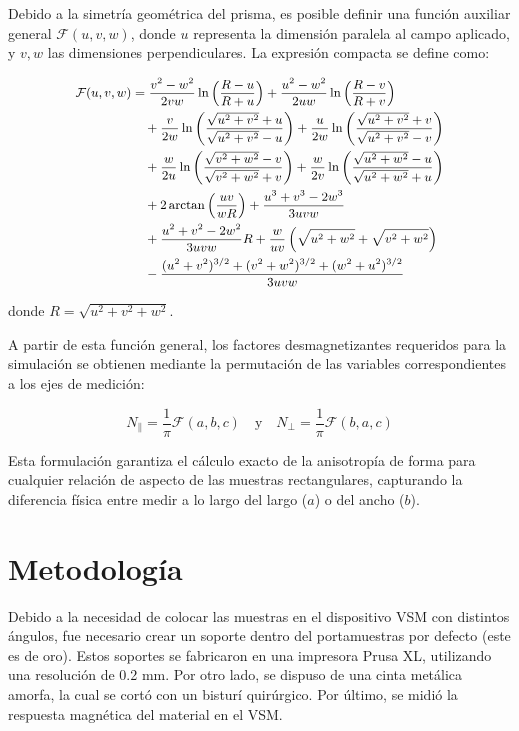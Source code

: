 Debido a la simetría geométrica del prisma, es posible definir una función auxiliar general $\mathcal{F}(u, v, w)$, donde $u$ representa la dimensión paralela al campo aplicado, y $v, w$ las dimensiones perpendiculares. La expresión compacta se define como:

\begin{equation} \small
\begin{split}
\mathcal{F}(u, v, w) &= \frac{v^2-w^2}{2vw} \ln\left( \frac{R-u}{R+u} \right) 
+ \frac{u^2-w^2}{2uw} \ln\left( \frac{R-v}{R+v} \right) \\
&\quad + \frac{v}{2w} \ln\left( \frac{\sqrt{u^2+v^2}+u}{\sqrt{u^2+v^2}-u} \right) 
+ \frac{u}{2w} \ln\left( \frac{\sqrt{u^2+v^2}+v}{\sqrt{u^2+v^2}-v} \right) \\
&\quad + \frac{w}{2u} \ln\left( \frac{\sqrt{v^2+w^2}-v}{\sqrt{v^2+w^2}+v} \right) 
+ \frac{w}{2v} \ln\left( \frac{\sqrt{u^2+w^2}-u}{\sqrt{u^2+w^2}+u} \right) \\
&\quad + 2 \arctan\left( \frac{uv}{wR} \right) + \frac{u^3+v^3-2w^3}{3uvw} \\
&\quad + \frac{u^2+v^2-2w^2}{3uvw} R 
+ \frac{w}{uv} \left( \sqrt{u^2+w^2} + \sqrt{v^2+w^2} \right) \\
&\quad - \frac{(u^2+v^2)^{3/2} + (v^2+w^2)^{3/2} + (w^2+u^2)^{3/2}}{3uvw}
\end{split}
\end{equation}

donde $R = \sqrt{u^2+v^2+w^2}$.

A partir de esta función general, los factores desmagnetizantes requeridos para la simulación se obtienen mediante la permutación de las variables correspondientes a los ejes de medición:

\begin{equation}
N_{\parallel} = \frac{1}{\pi} \mathcal{F}(a, b, c) \quad \text{y} \quad N_{\perp} = \frac{1}{\pi} \mathcal{F}(b, a, c)
\end{equation}

Esta formulación garantiza el cálculo exacto de la anisotropía de forma para cualquier relación de aspecto de las muestras rectangulares, capturando la diferencia física entre medir a lo largo del largo ($a$) o del ancho ($b$).

\section{Metodología}

Debido a la necesidad de colocar las muestras en el dispositivo VSM con distintos ángulos, fue necesario crear un soporte dentro del portamuestras por defecto (este es de oro). Estos soportes se fabricaron en una impresora Prusa XL, utilizando una resolución de 0.2 mm. Por otro lado, se dispuso de una cinta metálica amorfa, la cual se cortó con un bisturí quirúrgico. Por último, se midió la respuesta magnética del material en el VSM.


